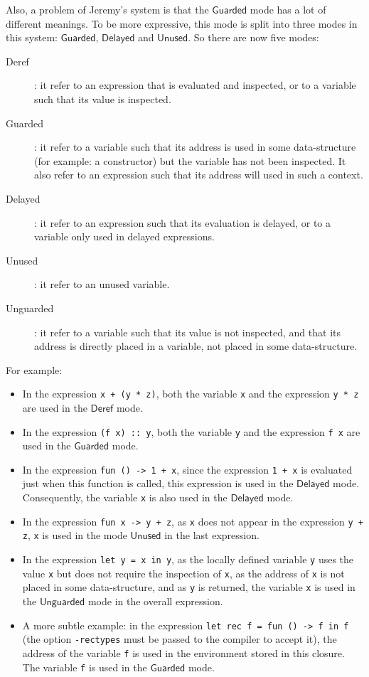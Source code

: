\documentclass{article}
\newcommand{\Deref}{\mathsf{Deref}}
\newcommand{\Unguarded}{\mathsf{Unguarded}}
\newcommand{\Guarded}{\mathsf{Guarded}}
\newcommand{\Delayed}{\mathsf{Delayed}}
\newcommand{\Unused}{\mathsf{Unused}}
\begin{document}
Also, a problem of Jeremy's system is that the $\Guarded$ mode has a lot of
different meanings. To be more expressive, this mode is split into three modes
in this system: $\Guarded$, $\Delayed$ and $\Unused$. So there are now five
modes:

\begin{description}
  \item[Deref]: it refer to an expression that is evaluated and inspected, or to
    a variable such that its value is inspected.
  \item[Guarded]: it refer to a variable such that its address is used in some
    data-structure (for example: a constructor) but the variable has not been
    inspected. It also refer to an expression such that its address will used
    in such a context.
  \item[Delayed]: it refer to an expression such that its evaluation is delayed,
    or to a variable only used in delayed expressions.
  \item[Unused]: it refer to an unused variable.
  \item[Unguarded]: it refer to a variable such that its value is not inspected,
    and that its address is directly placed in a variable, not placed in some
    data-structure.
\end{description}

For example:
\begin{itemize}
  \item In the expression \lstinline|x + (y * z)|, both the variable
    \lstinline|x| and the expression \lstinline|y * z| are used in the $\Deref$
    mode.
  \item In the expression \lstinline|(f x) :: y|, both the variable
    \lstinline|y| and the expression \lstinline|f x| are used in the $\Guarded$
    mode.
  \item In the expression \lstinline|fun () -> 1 + x|, since the expression
    \lstinline|1 + x| is evaluated just when this function is called, this
    expression is used in the $\Delayed$ mode. Consequently, the variable
    \lstinline|x| is also used in the $\Delayed$ mode.
  \item In the expression \lstinline|fun x -> y + z|, as \lstinline|x| does not
    appear in the expression \lstinline|y + z|, \lstinline|x| is used in the
    mode $\Unused$ in the last expression.
  \item In the expression \lstinline|let y = x in y|, as the locally defined
    variable \lstinline|y| uses the value \lstinline|x| but does not require the
    inspection of \lstinline|x|, as the address of \lstinline|x| is not placed
    in some data-structure, and as \lstinline|y| is returned, the variable
    \lstinline|x| is used in the $\Unguarded$ mode in the overall expression.
  \item A more subtle example: in the expression
    \lstinline|let rec f = fun () -> f in f| (the option \verb|-rectypes| must
    be passed to the compiler to accept it), the address of the variable
    \lstinline|f| is used in the environment stored in this closure.
    The variable \lstinline|f| is used in the $\Guarded$ mode.
\end{itemize}
\end{document}

